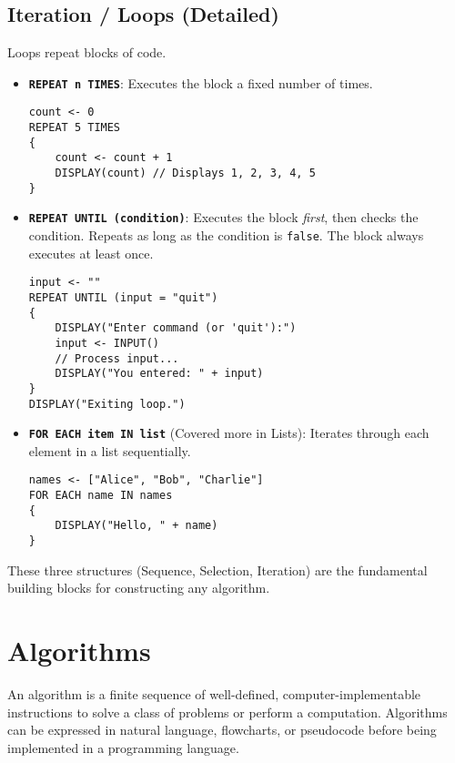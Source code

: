 \documentclass[11pt,oneside]{book}
\begin{document}
\subsection*{Iteration / Loops (Detailed)}
Loops repeat blocks of code.
\begin{itemize}
\item \textbf{\texttt{REPEAT n TIMES}}: Executes the block a fixed number of times.\\[1ex]
\begin{lstlisting}[language=APCSP, label={lst:repeat_n_detail}, caption={AP Pseudocode: REPEAT n TIMES}]
count <- 0
REPEAT 5 TIMES
{
    count <- count + 1
    DISPLAY(count) // Displays 1, 2, 3, 4, 5
}
\end{lstlisting}
\item \textbf{\texttt{REPEAT UNTIL (condition)}}: Executes the block \textit{first}, then checks the condition. Repeats as long as the condition is \texttt{false}. The block always executes at least once.\\[1ex]
\begin{lstlisting}[language=APCSP, label={lst:repeat_until_detail}, caption={AP Pseudocode: REPEAT UNTIL}]
input <- ""
REPEAT UNTIL (input = "quit")
{
    DISPLAY("Enter command (or 'quit'):")
    input <- INPUT()
    // Process input...
    DISPLAY("You entered: " + input)
}
DISPLAY("Exiting loop.")
\end{lstlisting}
\item \textbf{\texttt{FOR EACH item IN list}} (Covered more in Lists): Iterates through each element in a list sequentially.\\[1ex]
\begin{lstlisting}[language=APCSP, label={lst:for_each_detail}, caption={AP Pseudocode: FOR EACH}]
names <- ["Alice", "Bob", "Charlie"]
FOR EACH name IN names
{
    DISPLAY("Hello, " + name)
}
\end{lstlisting}
\end{itemize}
These three structures (Sequence, Selection, Iteration) are the fundamental building blocks for constructing any algorithm.

\section{Algorithms}
\label{sec:algorithms}
An algorithm is a finite sequence of well-defined, computer-implementable instructions to solve a class of problems or perform a computation.
Algorithms can be expressed in natural language, flowcharts, or pseudocode before being implemented in a programming language.
\end{document}
